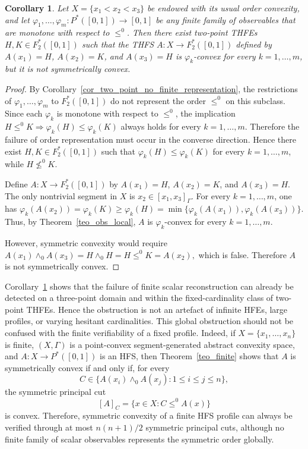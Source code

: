 \documentclass[11pt,a4paper]{article}
\newtheorem{corollary}{Corollary}
\begin{document}
\begin{corollary}\label{cor_three_point_scalar_failure}
Let \(X=\{x_1<x_2<x_3\}\) be endowed with its usual order convexity, and let \(\varphi_1,\dots,\varphi_m:P^*([0,1])\to[0,1]\) be any finite family of observables that are monotone with respect to \(\leq^0\). Then there exist two-point THFEs \(H,K\in F^*_2([0,1])\) such that the THFS \(A:X\to F^*_2([0,1])\) defined by \(A(x_1)=H\), \(A(x_2)=K\), and \(A(x_3)=H\) is \(\varphi_k\)-convex for every \(k=1,\dots,m\), but it is not symmetrically convex.
\end{corollary}

\begin{proof}
By Corollary~\ref{cor_two_point_no_finite_representation}, the restrictions of \(\varphi_1,\dots,\varphi_m\) to \(F^*_2([0,1])\) do not represent the order \(\leq^0\) on this subclass. Since each \(\varphi_k\) is monotone with respect to \(\leq^0\), the implication \(H\leq^0 K\Rightarrow \varphi_k(H)\leq\varphi_k(K)\) always holds for every \(k=1,\dots,m\). Therefore the failure of order representation must occur in the converse direction. Hence there exist \(H,K\in F^*_2([0,1])\) such that \(\varphi_k(H)\leq\varphi_k(K)\) for every \(k=1,\dots,m\), while \(H\not\leq^0 K\).

Define \(A:X\to F^*_2([0,1])\) by \(A(x_1)=H\), \(A(x_2)=K\), and \(A(x_3)=H\). The only nontrivial segment in \(X\) is \(x_2\in[x_1,x_3]_{\Gamma}\). For every \(k=1,\dots,m\), one has \(\varphi_k(A(x_2))=\varphi_k(K)\geq\varphi_k(H)=\min\{\varphi_k(A(x_1)),\varphi_k(A(x_3))\}\). Thus, by Theorem~\ref{teo_obs_local}, \(A\) is \(\varphi_k\)-convex for every \(k=1,\dots,m\).

However, symmetric convexity would require
\(
A(x_1)\wedge_0 A(x_3)
=
H\wedge_0 H
=
H
\leq^0
K
=
A(x_2),
\)
which is false. Therefore \(A\) is not symmetrically convex.
\end{proof}


Corollary~\ref{cor_three_point_scalar_failure} shows that the failure of finite scalar reconstruction can already be detected on a three-point domain and within the fixed-cardinality class of two-point THFEs. Hence the obstruction is not an artefact of infinite HFEs, large profiles, or varying hesitant cardinalities. This global obstruction should not be confused with the finite verifiability of a fixed profile. Indeed, if \(X=\{x_1,\ldots,x_n\}\) is finite, \((X,\Gamma)\) is a point-convex segment-generated abstract convexity space, and \(A:X\to P^*([0,1])\) is an HFS, then Theorem~\ref{teo_finite} shows that \(A\) is symmetrically convex if and only if, for every
\[
C\in\{A(x_i)\wedge_0 A(x_j):1\le i\le j\le n\},
\]
the symmetric principal cut
\[
[A]_C=\{x\in X:C\leq^0 A(x)\}
\]
is convex. Therefore, symmetric convexity of a finite HFS profile can always be verified through at most \(n(n+1)/2\) symmetric principal cuts, although no finite family of scalar observables represents the symmetric order globally.
\end{document}
